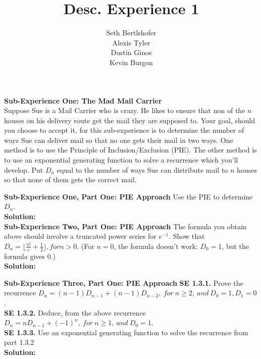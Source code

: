 \documentclass[10pt,a4paper]{report}
\author{Seth Bertlshofer\\Alexis Tyler\\Dustin Ginos\\Kevin Burgon}
\title{Desc. Experience 1}
\begin{document}
	\maketitle
	\textbf{Sub-Experience One: The Mad Mail Carrier}\\
	Suppose Sue is a Mail Carrier who is crazy.  He likes to ensure that non of the $n$ houses on his delivery route get the mail they are supposed to.  Your goal, should you choose to accept it, for this sub-experience is to determine the number of ways Sue can deliver mail so that no one gets their mail in two ways.  One method is to use the Principle of Inclusion/Exclusion (PIE).  The other method is to use an exponential generating function to solve a recurrence which you'll develop.  Put $D_n$ equal to the number of ways Sue can distribute mail to $n$ houses so that none of them gets the correct mail.
	
	\textbf{Sub-Experience One, Part One: PIE Approach}
	Use the PIE to determine $D_n$.\\
	
	\textbf{Solution: }\\
	\newline
	\textbf{Sub-Experience Two, Part One: PIE Approach}
	The formula you obtain above should involve a truncated power series for $e^{-1}$.  Show that $D_n = \lfloor\frac{n!}{e}+\frac{1}{2}\rfloor, for n > 0$. (For $n=0$, the formula doesn't work: $D_0 = 1$, but the formula gives 0.)\\
	\textbf{Solution: }\\
	\newline
	
	\textbf{Sub-Experience Three, Part One: PIE Approach}
	\textbf{SE 1.3.1.} Prove the recurrence $D_n = (n-1)D_{n-1} + (n-1)D_{n-2},\ for\ n\geq 2,\ and\ D_0 = 1, D_1=0$.\\
	\textbf{SE 1.3.2.} Deduce, from the above recurrence $D_n = nD_{n-1}+(-1)^n,\ for\ n\geq 1,\ and\ D_0 = 1$.\\
	\textbf{SE 1.3.3.} Use an exponential generating function to solve the recurrence from part 1.3.2\\
	\textbf{Solution: }\\
	\newline
	
\end{document}
